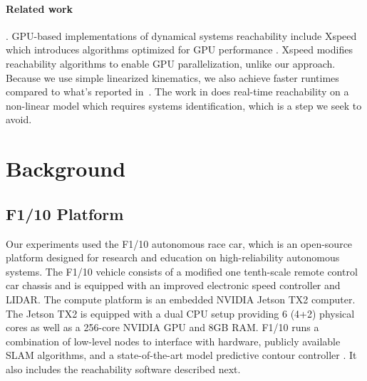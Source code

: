 \documentclass[runningheads]{llncs}
\begin{document}
\paragraph{Related work}. GPU-based implementations of dynamical systems reachability include Xspeed which introduces algorithms optimized for GPU performance \cite{xspeed}. Xspeed modifies reachability algorithms to enable GPU parallelization, unlike our approach. Because we use simple linearized kinematics, we also achieve faster runtimes compared to what's reported in~\cite{xspeed}.
The work in \cite{althoff} does real-time reachability on a non-linear model which requires systems identification, which is a step we seek to avoid.

\section{Background}
\subsection{F1/10 Platform}
Our experiments used the F1/10 autonomous race car, which is an open-source platform designed for research and education on high-reliability autonomous systems. The F1/10 vehicle consists of a modified one tenth-scale remote control car chassis and is equipped with an improved electronic speed controller and LIDAR. The compute platform is an embedded NVIDIA Jetson TX2 computer. The Jetson TX2 is equipped with a dual CPU setup providing 6 (4+2) physical cores as well as a 256-core NVIDIA GPU and 8GB RAM. F1/10 runs a combination of low-level nodes to interface with hardware, publicly available SLAM algorithms, and a state-of-the-art model predictive contour controller \cite{mpcc}. 
It also includes the reachability software described next.
\end{document}
